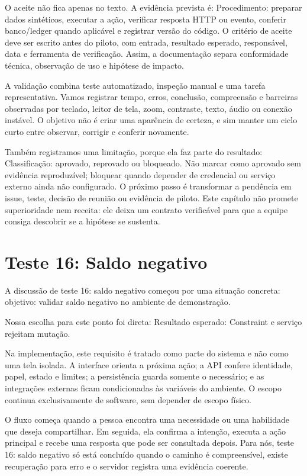 \documentclass[12pt,oneside,a4paper,article]{abntex2}
\begin{document}
O aceite não fica apenas no texto. A evidência prevista é: Procedimento: preparar dados sintéticos, executar a ação, verificar resposta HTTP ou evento, conferir banco/ledger quando aplicável e registrar versão do código. O critério de aceite deve ser escrito antes do piloto, com entrada, resultado esperado, responsável, data e ferramenta de verificação. Assim, a documentação separa conformidade técnica, observação de uso e hipótese de impacto.

A validação combina teste automatizado, inspeção manual e uma tarefa representativa. Vamos registrar tempo, erros, conclusão, compreensão e barreiras observadas por teclado, leitor de tela, zoom, contraste, texto, áudio ou conexão instável. O objetivo não é criar uma aparência de certeza, e sim manter um ciclo curto entre observar, corrigir e conferir novamente.

Também registramos uma limitação, porque ela faz parte do resultado: Classificação: aprovado, reprovado ou bloqueado. Não marcar como aprovado sem evidência reproduzível; bloquear quando depender de credencial ou serviço externo ainda não configurado. O próximo passo é transformar a pendência em issue, teste, decisão de reunião ou evidência de piloto. Este capítulo não promete superioridade nem receita: ele deixa um contrato verificável para que a equipe consiga descobrir se a hipótese se sustenta.

\section{Teste 16: Saldo negativo}
A discussão de teste 16: saldo negativo começou por uma situação concreta: objetivo: validar saldo negativo no ambiente de demonstração.

Nossa escolha para este ponto foi direta: Resultado esperado: Constraint e serviço rejeitam mutação.

Na implementação, este requisito é tratado como parte do sistema e não como uma tela isolada. A interface orienta a próxima ação; a API confere identidade, papel, estado e limites; a persistência guarda somente o necessário; e as integrações externas ficam condicionadas às variáveis do ambiente. O escopo continua exclusivamente de software, sem depender de escopo físico.

O fluxo começa quando a pessoa encontra uma necessidade ou uma habilidade que deseja compartilhar. Em seguida, ela confirma a intenção, executa a ação principal e recebe uma resposta que pode ser consultada depois. Para nós, teste 16: saldo negativo só está concluído quando o caminho é compreensível, existe recuperação para erro e o servidor registra uma evidência coerente.
\end{document}
